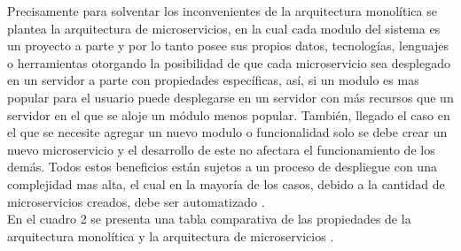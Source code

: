 Precisamente para solventar los inconvenientes de la arquitectura monolítica se plantea la arquitectura de microservicios, en la cual cada modulo del sistema es un proyecto a parte y por lo tanto posee sus propios datos, tecnologías, lenguajes o herramientas otorgando la posibilidad de que cada microservicio sea desplegado en un servidor a parte con propiedades específicas, así, si un modulo es mas popular para el usuario puede desplegarse en un servidor con más recursos que un servidor en el que se aloje un módulo menos popular. También, llegado el caso en el que se necesite agregar un nuevo modulo o funcionalidad solo se debe crear un nuevo microservicio y el desarrollo de este no afectara el funcionamiento de los demás.  Todos estos beneficios están sujetos a un proceso de despliegue  con una complejidad mas alta, el cual en la mayoría de los casos,  debido a la cantidad de microservicios creados, debe ser automatizado \cite{Netflix}.\\

En el cuadro 2 se presenta una tabla comparativa de las propiedades de la arquitectura monolítica y la arquitectura de microservicios \cite{Lopez2017}.

